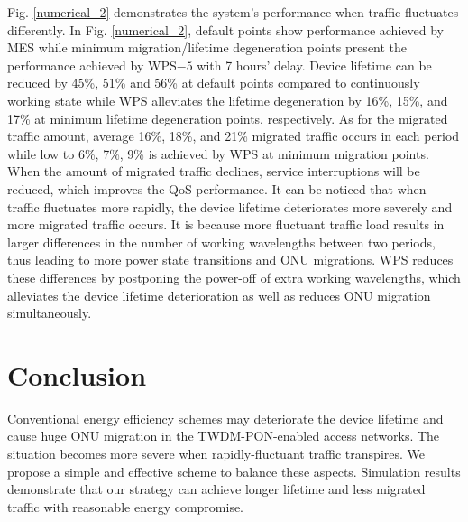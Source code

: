 \documentclass[letter]{IEEEtran}
\begin{document}
Fig. \ref{numerical_2} demonstrates the system's performance when traffic fluctuates differently. In Fig. \ref{numerical_2}, default points show performance achieved by MES while minimum migration/lifetime degeneration points present the performance achieved by WPS$ -5 $ with 7 hours' delay. Device lifetime can be reduced by 45\%, 51\% and 56\% at default points compared to continuously working state while WPS alleviates the lifetime degeneration by 16\%, 15\%, and 17\% at minimum lifetime degeneration points, respectively. As for the migrated traffic amount, average 16\%, 18\%, and 21\% migrated traffic occurs in each period while low to 6\%, 7\%, 9\% is achieved by WPS at minimum migration points. When the amount of migrated traffic declines, service interruptions will be reduced, which improves the QoS performance.
It can be noticed that when traffic fluctuates more rapidly, the device lifetime deteriorates more severely and more migrated traffic occurs. It is because more fluctuant traffic load results in larger differences in the number of working wavelengths between two periods, thus leading to more power state transitions and ONU migrations. WPS reduces these differences by postponing the power-off of extra working wavelengths, which alleviates the device lifetime deterioration as well as reduces ONU migration simultaneously.
\vspace{-3.0mm}

\section{Conclusion}
Conventional energy efficiency schemes may deteriorate the device lifetime and cause huge ONU migration in the TWDM-PON-enabled access networks. The situation becomes more severe when rapidly-fluctuant traffic transpires. We propose a simple and effective scheme to balance these aspects. Simulation results demonstrate that our strategy can achieve longer lifetime and less migrated traffic with reasonable energy compromise.
\vspace{-5.0mm}

\end{document}
